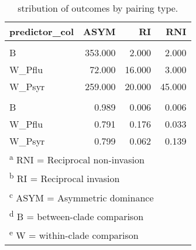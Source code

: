 \begin{table}

\caption{stribution of outcomes by pairing type.}
\centering
\fontsize{8}{10}\selectfont
\begin{tabular}[t]{lrrr}
\toprule
predictor\_col & ASYM & RI & RNI\\
\midrule
\addlinespace[0.3em]
\multicolumn{4}{l}{\textbf{Counts}}\\
\hspace{1em}B & 353.000 & 2.000 & 2.000\\
\hspace{1em}W\_Pflu & 72.000 & 16.000 & 3.000\\
\hspace{1em}W\_Psyr & 259.000 & 20.000 & 45.000\\
\addlinespace[0.3em]
\multicolumn{4}{l}{\textbf{Frequencies}}\\
\hspace{1em}B & 0.989 & 0.006 & 0.006\\
\hspace{1em}W\_Pflu & 0.791 & 0.176 & 0.033\\
\hspace{1em}W\_Psyr & 0.799 & 0.062 & 0.139\\
\bottomrule
\multicolumn{4}{l}{\textsuperscript{a} RNI = Reciprocal non-invasion}\\
\multicolumn{4}{l}{\textsuperscript{b} RI = Reciprocal invasion}\\
\multicolumn{4}{l}{\textsuperscript{c} ASYM = Asymmetric dominance}\\
\multicolumn{4}{l}{\textsuperscript{d} B = between-clade comparison}\\
\multicolumn{4}{l}{\textsuperscript{e} W = within-clade comparison}\\
\end{tabular}
\end{table}